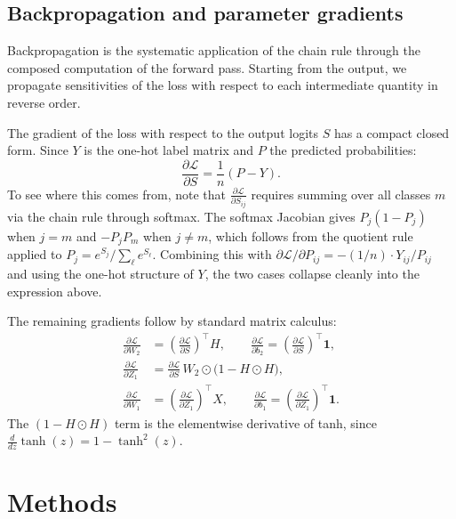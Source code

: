 \documentclass[11pt]{article}
\begin{document}
\subsection{Backpropagation and parameter gradients}

Backpropagation is the systematic application of the chain rule through the composed
computation of the forward pass. Starting from the output, we propagate sensitivities
of the loss with respect to each intermediate quantity in reverse order.

The gradient of the loss with respect to the output logits $S$ has a compact closed
form. Since $Y$ is the one-hot label matrix and $P$ the predicted probabilities:
\begin{equation}
    \frac{\partial \mathcal{L}}{\partial S} = \frac{1}{n}(P - Y).
\end{equation}
To see where this comes from, note that $\frac{\partial \mathcal{L}}{\partial S_{ij}}$
requires summing over all classes $m$ via the chain rule through softmax. The softmax
Jacobian gives $P_j(1 - P_j)$ when $j = m$ and $-P_j P_m$ when $j \neq m$, which
follows from the quotient rule applied to $P_j = e^{S_j}/\sum_\ell e^{S_\ell}$.
Combining this with $\partial \mathcal{L}/\partial P_{ij} = -(1/n) \cdot Y_{ij}/P_{ij}$
and using the one-hot structure of $Y$, the two cases collapse cleanly into the
expression above.

The remaining gradients follow by standard matrix calculus:
\begin{align}
    \frac{\partial \mathcal{L}}{\partial W_2}
        &= \left(\frac{\partial \mathcal{L}}{\partial S}\right)^\top H,
    \qquad
    \frac{\partial \mathcal{L}}{\partial b_2}
        = \left(\frac{\partial \mathcal{L}}{\partial S}\right)^\top \mathbf{1}, \\[4pt]
    \frac{\partial \mathcal{L}}{\partial Z_1}
        &= \frac{\partial \mathcal{L}}{\partial S}\, W_2
           \odot \bigl(1 - H \odot H\bigr), \\[4pt]
    \frac{\partial \mathcal{L}}{\partial W_1}
        &= \left(\frac{\partial \mathcal{L}}{\partial Z_1}\right)^\top X,
    \qquad
    \frac{\partial \mathcal{L}}{\partial b_1}
        = \left(\frac{\partial \mathcal{L}}{\partial Z_1}\right)^\top \mathbf{1}.
\end{align}
The $(1 - H \odot H)$ term is the elementwise derivative of tanh, since
$\tfrac{d}{dz}\tanh(z) = 1 - \tanh^2(z)$.

\section{Methods}
\end{document}
